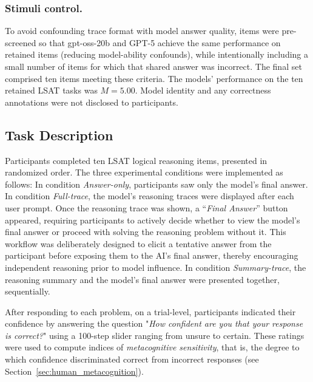 \documentclass[acmlarge,review=true, anonymous=true]{acmart}
\begin{document}
\subsubsection{Stimuli control.}\label{sec:stimuli_control}
To avoid confounding trace format with model answer quality, items were pre-screened so that gpt-oss-20b and GPT-5 achieve the same performance on retained items (reducing model-ability confounds), while intentionally including a small number of items for which that shared answer was incorrect. The final set comprised ten items meeting these criteria. The models' performance on the ten retained LSAT tasks was $M=5.00$. Model identity and any correctness annotations were not disclosed to participants.

\subsection{Task Description}\label{sec:task description}

Participants completed ten LSAT logical reasoning items, presented in randomized order. 
The three experimental conditions were implemented as follows: In condition \textit{Answer-only}, participants saw only the model’s final answer. In condition \textit{Full-trace}, the model’s reasoning traces were displayed after each user prompt. Once the reasoning trace was shown, a ``\textit{Final Answer}'' button appeared, requiring participants to actively decide whether to view the model’s final answer or proceed with solving the reasoning problem without it. This workflow was deliberately designed to elicit a tentative answer from the participant before exposing them to the AI’s final answer, thereby encouraging independent reasoning prior to model influence. In condition \textit{Summary-trace}, the reasoning summary and the model’s final answer were presented together, sequentially. 

After responding to each problem, on a trial-level, participants indicated their confidence by answering the question "\textit{How confident are you that your response is correct?}" using a 100-step slider ranging from unsure to certain. These ratings were used to compute indices of \textit{metacognitive sensitivity}, that is, the degree to which confidence discriminated correct from incorrect responses (see Section~\ref{sec:human_metacognition}).
\end{document}
